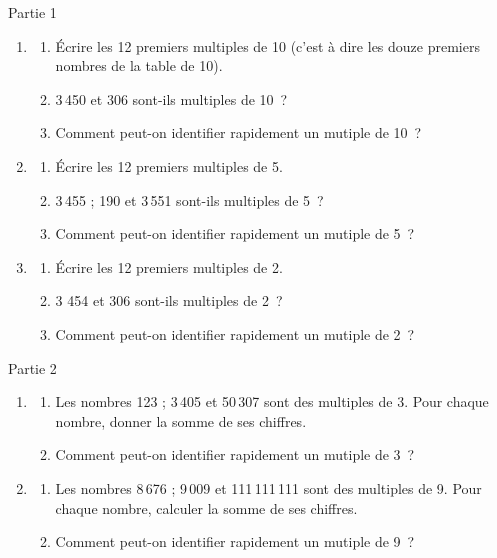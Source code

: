 \documentclass[activite]{thedocument}
\begin{document}
\vskip5pt
{\large\centering Partie 1\par}\baselineskip20pt
\begin{enumerate}
    \item
    \begin{enumerate}
        \item Écrire les 12 premiers multiples de 10 (c'est à dire les douze premiers nombres de la table de 10).
        \item 3\,450 et 306 sont-ils multiples de 10~?
        \item Comment peut-on identifier rapidement un mutiple de 10~?
    \end{enumerate}
    \item
    \begin{enumerate}
        \item Écrire les 12 premiers multiples de 5.
        \item 3\,455 ; 190 et 3\,551 sont-ils multiples de 5~?
        \item Comment peut-on identifier rapidement un mutiple de 5~?
    \end{enumerate}
    \item
    \begin{enumerate}
        \item Écrire les 12 premiers multiples de 2.
        \item 3 454 et 306 sont-ils multiples de 2~?
        \item Comment peut-on identifier rapidement un mutiple de 2~?
    \end{enumerate}
\end{enumerate}
\vskip5pt
{\large\centering Partie 2\par}
\begin{enumerate}
    \item \begin{enumerate}
        \item Les nombres 123 ; 3\,405 et 50\,307 sont des multiples de 3. Pour
        chaque nombre, donner la somme de ses chiffres.
        \item Comment peut-on identifier rapidement un mutiple de 3~?  
    \end{enumerate}
    \item \begin{enumerate}
        \item Les nombres 8\,676 ; 9\,009 et 111\,111\,111 sont des multiples
        de 9. Pour chaque nombre, calculer la somme de ses chiffres.
        \item Comment peut-on identifier rapidement un mutiple de 9~?  
    \end{enumerate}
\end{enumerate}
\end{document}
